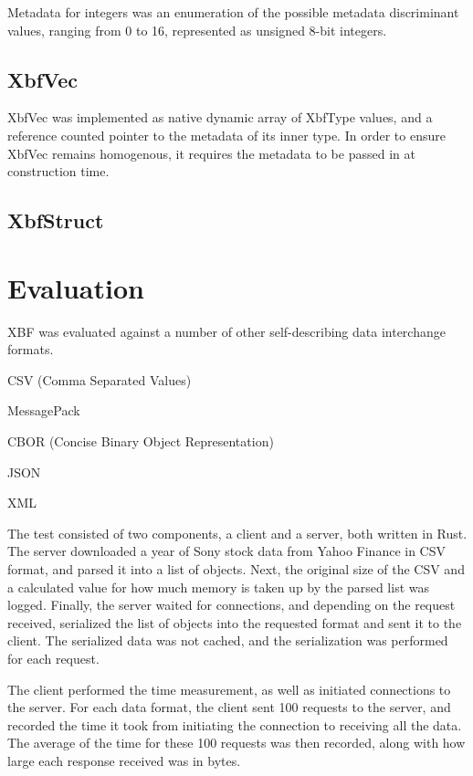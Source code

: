 \documentclass[conference]{IEEEtran}
\begin{document}
Metadata for integers was an enumeration of the possible metadata discriminant values, ranging from 0 to 16, represented as unsigned 8-bit integers.

\subsection{XbfVec}\label{vec}

XbfVec was implemented as native dynamic array of XbfType values, and a reference counted pointer to the metadata of its inner type. In order to ensure XbfVec remains homogenous, it requires the metadata to be passed in at construction time.

\subsection{XbfStruct}\label{struct}

\section{Evaluation}

XBF was evaluated against a number of other self-describing data interchange formats.

\begin{IEEEitemize}
	\item CSV (Comma Separated Values)\cite{csv_spec}\cite{csv_parser}
	\item MessagePack\cite{msgpack_spec}\cite{msgpack_parser}
	\item CBOR (Concise Binary Object Representation)\cite{cbor_spec}\cite{cbor_parser}
	\item JSON\cite{json_parser}
	\item XML\cite{xml_parser}
\end{IEEEitemize}

The test consisted of two components, a client and a server, both written in Rust. The server downloaded a year of Sony stock data from Yahoo Finance\cite{sony_stock_data} in CSV format, and parsed it into a list of objects. Next, the original size of the CSV and a calculated value for how much memory is taken up by the parsed list was logged. Finally, the server waited for connections, and depending on the request received, serialized the list of objects into the requested format and sent it to the client. The serialized data was not cached, and the serialization was performed for each request.

The client performed the time measurement, as well as initiated connections to the server. For each data format, the client sent 100 requests to the server, and recorded the time it took from initiating the connection to receiving all the data. The average of the time for these 100 requests was then recorded, along with how large each response received was in bytes.
\end{document}
